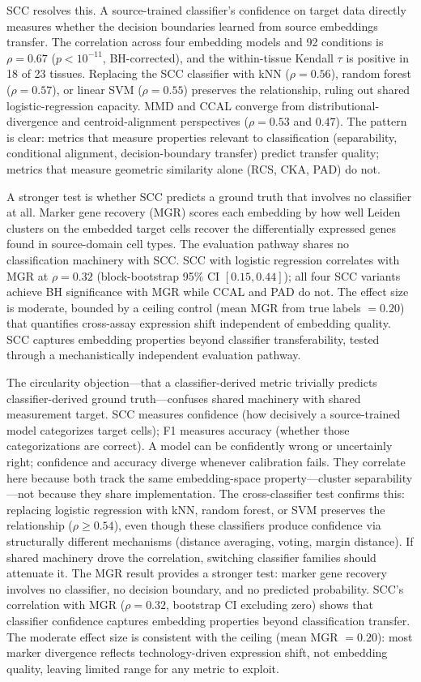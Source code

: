 \documentclass[11pt]{article}
\begin{document}
SCC resolves this. A source-trained classifier's confidence on target
data directly measures whether the decision boundaries learned from
source embeddings transfer. The correlation across four embedding
models and 92 conditions is $\rho = 0.67$ ($p < 10^{-11}$, BH-corrected), and the
within-tissue Kendall $\tau$ is positive in 18 of 23 tissues.
Replacing the SCC classifier with kNN ($\rho = 0.56$), random forest
($\rho = 0.57$), or linear SVM ($\rho = 0.55$) preserves the
relationship, ruling out shared logistic-regression capacity. MMD and
CCAL converge from distributional-divergence and centroid-alignment
perspectives ($\rho = 0.53$ and $0.47$). The pattern is clear:
metrics that measure properties relevant to classification
(separability, conditional alignment, decision-boundary transfer)
predict transfer quality; metrics that measure geometric similarity
alone (RCS, CKA, PAD) do not.

A stronger test is whether SCC predicts a ground truth that involves
no classifier at all. Marker gene recovery (MGR) scores each embedding
by how well Leiden clusters on the embedded target cells recover the
differentially expressed genes found in source-domain cell types. The
evaluation pathway shares no classification machinery with SCC. SCC
with logistic regression correlates with MGR at $\rho = 0.32$
(block-bootstrap 95\% CI $[0.15, 0.44]$); all four SCC variants
achieve BH significance with MGR while CCAL and PAD do not. The
effect size is moderate, bounded by a ceiling control (mean MGR from
true labels $= 0.20$) that quantifies cross-assay expression shift
independent of embedding quality. SCC captures embedding properties
beyond classifier transferability, tested through a mechanistically
independent evaluation pathway.

The circularity objection---that a classifier-derived metric trivially
predicts classifier-derived ground truth---confuses shared machinery
with shared measurement target. SCC measures confidence (how decisively
a source-trained model categorizes target cells); F1 measures accuracy
(whether those categorizations are correct). A model can be confidently
wrong or uncertainly right; confidence and accuracy diverge whenever
calibration fails. They correlate here because both track the same
embedding-space property---cluster separability---not because they share
implementation. The cross-classifier test confirms this: replacing
logistic regression with kNN, random forest, or SVM preserves the
relationship ($\rho \geq 0.54$), even though these classifiers produce
confidence via structurally different mechanisms (distance averaging,
voting, margin distance). If shared machinery drove the correlation,
switching classifier families should attenuate it. The MGR result
provides a stronger test: marker gene recovery involves no classifier,
no decision boundary, and no predicted probability. SCC's correlation
with MGR ($\rho = 0.32$, bootstrap CI excluding zero) shows that
classifier confidence captures embedding properties beyond
classification transfer. The moderate effect size is consistent with
the ceiling (mean MGR $= 0.20$): most marker divergence reflects
technology-driven expression shift, not embedding quality, leaving
limited range for any metric to exploit.
\end{document}
